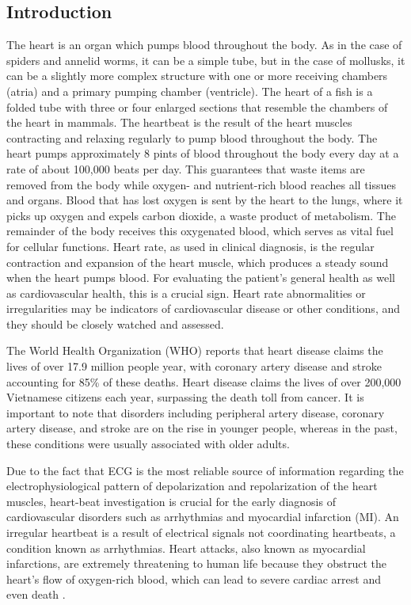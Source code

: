 \documentclass{article}
\begin{document}
\begin{multicols}{2}
\section{Introduction}
The heart is an organ which pumps blood throughout the body. As in the case of spiders and annelid worms, it can be a simple tube, but in the case of mollusks, it can be a slightly more complex structure with one or more receiving chambers (atria) and a primary pumping chamber (ventricle). The heart of a fish is a folded tube with three or four enlarged sections that resemble the chambers of the heart in mammals.
The heartbeat is the result of the heart muscles contracting and relaxing regularly to pump blood throughout the body. The heart pumps approximately 8 pints of blood throughout the body every day at a rate of about 100,000 beats per day. This guarantees that waste items are removed from the body while oxygen- and nutrient-rich blood reaches all tissues and organs. Blood that has lost oxygen is sent by the heart to the lungs, where it picks up oxygen and expels carbon dioxide, a waste product of metabolism. The remainder of the body receives this oxygenated blood, which serves as vital fuel for cellular functions.
Heart rate, as used in clinical diagnosis, is the regular contraction and expansion of the heart muscle, which produces a steady sound when the heart pumps blood. For evaluating the patient's general health as well as cardiovascular health, this is a crucial sign. Heart rate abnormalities or irregularities may be indicators of cardiovascular disease or other conditions, and they should be closely watched and assessed.

The World Health Organization (WHO) reports that heart disease claims the lives of over 17.9 million people year, with coronary artery disease and stroke accounting for 85\% of these deaths. Heart disease claims the lives of over 200,000 Vietnamese citizens each year, surpassing the death toll from cancer. It is important to note that disorders including peripheral artery disease, coronary artery disease, and stroke are on the rise in younger people, whereas in the past, these conditions were usually associated with older adults.

Due to the fact that ECG is the most reliable source of information regarding the electrophysiological pattern of depolarization and repolarization of the heart muscles, heart-beat investigation is crucial for the early diagnosis of cardiovascular disorders such as arrhythmias and myocardial infarction (MI). An irregular heartbeat is a result of electrical signals not coordinating heartbeats, a condition known as arrhythmias. Heart attacks, also known as myocardial infarctions, are extremely threatening to human life because they obstruct the heart's flow of oxygen-rich blood, which can lead to severe cardiac arrest and even death \cite{Bib0}.


\end{multicols}
\end{document}
